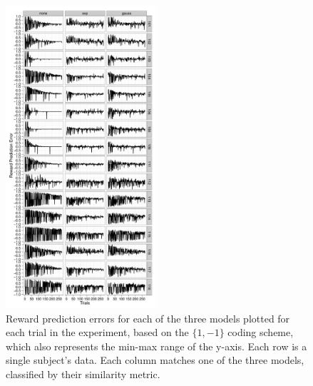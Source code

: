 \begin{figure}[tp]
    \includegraphics[width=0.5\textwidth]{f_rpe_gl}
    \centering
    \caption{Reward prediction errors for each of the three models plotted for each trial in the experiment, based on the $\{1,-1\}$ coding scheme, which also represents the min-max range of the y-axis.   Each row is a single subject's data.  Each column matches one of the three models, classified by their similarity metric.}
    \label{fig:rpegl}
\end{figure}

